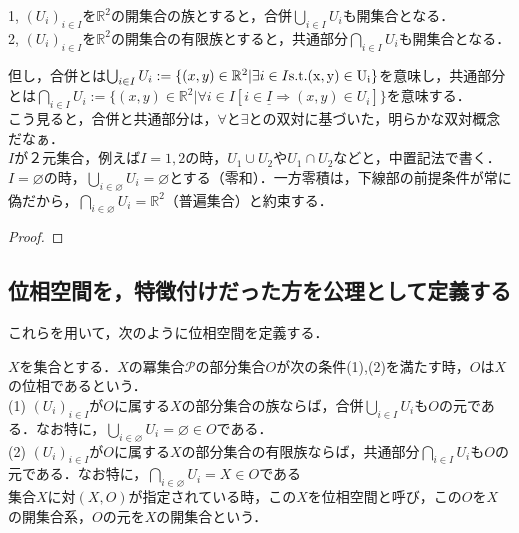\documentclass[uplatex, 12pt, a4paper, dvipdfmx]{jsarticle}
\begin{document}
\begin{shadebox}\begin{proposition}[Euclid空間の開集合の集合演算に対する性質]\label{proposition1}
    1, $(U_i)_{i\in I}$を$\mathbb{R}^2$の開集合の族とすると，合併$\bigcup_{i\in I}U_i$も開集合となる．\\
    2, $(U_i)_{i\in I}$を$\mathbb{R}^2$の開集合の有限族とすると，共通部分$\bigcap_{i\in I}U_i$も開集合となる．\\
\end{proposition}\end{shadebox}

但し，合併とは$\bigcup_{i\in I}U_i := \{ (x,y)\in\mathbb{R}^2 | \exists i\in I \rm{s.t.} (x,y)\in U_i \}$を意味し，共通部分とは$\bigcap_{i\in I}U_i := \{ (x,y)\in\mathbb{R}^2 | \forall i\in I [\underline{i\in I \Longrightarrow} (x,y)\in U_i ]\}$を意味する．\\
こう見ると，合併と共通部分は，$\forall と \exists$との双対に基づいた，明らかな双対概念だなぁ．\\
$I$が２元集合，例えば$I={1,2}$の時，$U_1 \cup U_2$や$U_1 \cap U_2$などと，中置記法で書く．$I=\varnothing$の時，$\bigcup_{i\in\varnothing}U_i = \varnothing$とする（零和）．一方零積は，下線部の前提条件が常に偽だから，$\bigcap_{i\in\varnothing}U_i = \mathbb{R}^2$（普遍集合）と約束する．\\

\begin{proof}

\end{proof}

\subsection{位相空間を，特徴付けだった方を公理として定義する}

これらを用いて，次のように位相空間を定義する．

\begin{shadebox}\begin{definition}[位相空間]
    $X$を集合とする．$X$の冪集合$\mathcal{P}$の部分集合$O$が次の条件(1),(2)を満たす時，$O$は$X$の位相であるという．\\
    (1) $(U_i)_{i\in I}$が$O$に属する$X$の部分集合の族ならば，合併$\bigcup_{i\in I}U_i$も$O$の元である．なお特に，$\bigcup_{i\in\varnothing}U_i=\varnothing\in O$である．\\
    (2) $(U_i)_{i\in I}$が$O$に属する$X$の部分集合の有限族ならば，共通部分$\bigcap_{i\in I}U_i$も$O$の元である．なお特に，$\bigcap_{i\in\varnothing}U_i=X\in O$である\\
    集合$X$に対$(X,O)$が指定されている時，この$X$を位相空間と呼び，この$O$を$X$の開集合系，$O$の元を$X$の開集合という．
\end{definition}\end{shadebox}
\end{document}
